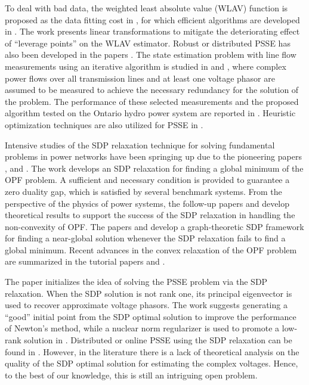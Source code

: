 \documentclass[journal,twoside]{IEEEtran}
\begin{document}
To deal with bad data, the weighted least absolute value (WLAV) function is proposed as the data fitting cost in \cite{Irving78, Kotiuga82},
for which efficient algorithms are developed in \cite{Singh94,Abur91}.
The work \cite{Celik92} presents linear transformations to mitigate the deteriorating effect of ``leverage points'' on the WLAV estimator.
Robust or distributed PSSE has also been developed in the papers \cite{Irving08, Kekatos13, Conejo07, Minot16}.
The state estimation problem with line flow measurements using an iterative algorithm is studied in \cite{Dopazo70} and \cite{Dopazo70_2},
where complex power flows over all transmission lines and at least one voltage phasor are assumed to be measured to achieve the necessary redundancy for the solution of the problem. The performance of these selected measurements and the proposed algorithm tested on the Ontario hydro power system are reported in \cite{Porretta73}. Heuristic optimization techniques are also utilized for PSSE in \cite{Naka03,Lee08}.


Intensive studies of the SDP relaxation technique for solving fundamental problems in power networks have been springing up due to the pioneering papers \cite{Bai08}, \cite{lavaei2011_1} and \cite{LL2012_1}.
The work \cite{LL2012_1} develops an SDP relaxation for finding a global minimum of the OPF problem.
A sufficient and necessary condition  is provided to guarantee a zero duality gap, which is satisfied by several benchmark systems.
From the perspective of the physics of power systems, the follow-up papers \cite{SLa12} and \cite{sojoudi2014exactness} develop theoretical results to support the success of the
SDP relaxation in handling the non-convexity of OPF.
The papers \cite{madani2013convex} and \cite{madani2014promises} develop a graph-theoretic SDP framework
for finding a near-global solution whenever the SDP relaxation fails to find a global minimum.
Recent advances in the convex relaxation of the OPF problem are summarized in the tutorial papers \cite{Low2014_1} and \cite{Low2014_2}.

The paper \cite{Zhu11} initializes the idea of solving the PSSE problem via the SDP relaxation.
When the SDP  solution is not rank one, its principal eigenvector is used to recover approximate voltage phasors.
 The work \cite{Weng12} suggests generating a ``good'' initial point from the SDP optimal solution
to improve the performance of Newton's method, while a nuclear norm regularizer is used to promote a low-rank solution in \cite{Weng15}.
Distributed or online PSSE using the SDP relaxation can be found in \cite{Weng13,Zhu14,KimGG14}.
However, in the literature there is a lack of theoretical analysis on 
the quality of the SDP optimal solution for estimating the complex voltages. 
Hence, to the best of our knowledge, this is still an intriguing open problem.
\end{document}
